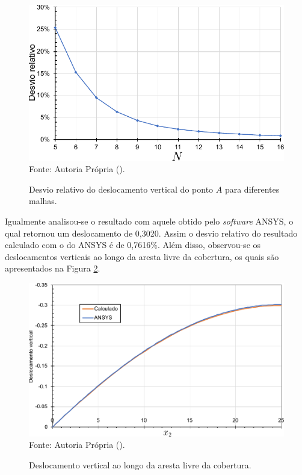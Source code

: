 \begin{figure}[h!]
    \centering
    \caption{Desvio relativo do deslocamento vertical do ponto $A$ para diferentes malhas.}
    \includegraphics[width=0.75\linewidth]{Figuras/scordelis/static-sol.pdf}
    \\Fonte: Autoria Própria (\the\year).
    \label{fig:shell-static-sol}
\end{figure}

Igualmente analisou-se o resultado com aquele obtido pelo \textit{software} ANSYS, o qual retornou um deslocamento de 0,3020. Assim o desvio relativo do resultado calculado com o do ANSYS é de 0,7616\%. Além disso, observou-se os deslocamentos verticais ao longo da aresta livre da cobertura, os quais são apresentados na Figura \ref{fig:scordelis-graph}.

\begin{figure}[h!]
    \centering
    \caption{Deslocamento vertical ao longo da aresta livre da cobertura.}
    \includegraphics[width=0.7\linewidth]{Figuras/scordelis/deslocamento.pdf}
    \\Fonte: Autoria Própria (\the\year).
    \label{fig:scordelis-graph}
\end{figure}